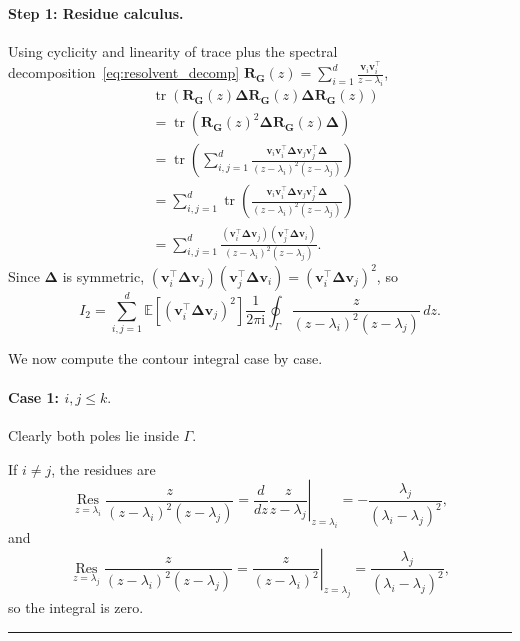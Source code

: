 \documentclass{article}
\newcommand{\Ex}[1]{\mbox{}\mathbb{E}\left[#1\right]}
\newcommand{\ts}{\top}
\newcommand{\vb}{\mathbf{v}}
\newcommand{\Gb}{\mathbf{G}}
\newcommand{\Rb}{\mathbf{R}}
\newcommand{\BlackBox}{\rule{1.5ex}{1.5ex}}  %
\newenvironment{proof}{\par\noindent{\bf Proof\ }}{\hfill\BlackBox\par\medskip}
\newcommand{\tr}{\mathop{\mathrm{tr}}}
\newcommand{\rbr}[1]{\left(#1\right)}
\newcommand{\Deltab}{\boldsymbol{\Delta}}
\begin{document}
\begin{proof}
\paragraph{Step 1: Residue calculus.}
Using cyclicity and linearity of trace plus the spectral decomposition~\eqref{eq:resolvent_decomp} $\Rb_\Gb(z) = \sum_{i=1}^d\frac{\vb_i\vb_i^\ts}{z-\lambda_i}$,
\begin{align*}
    &\tr\rbr{\Rb_\Gb(z) \Deltab \Rb_\Gb(z)\Deltab \Rb_\Gb(z)}\\
    &= \tr\rbr{\Rb_\Gb(z)^2 \Deltab \Rb_\Gb(z)\Deltab}\\
    &= \tr \rbr{\sum_{i,j=1}^{d}  \frac{\vb_i \vb_i^\ts \Deltab  \vb_j \vb_j^\ts \Deltab}{(z-\lambda_i)^2(z-\lambda_j)}}\\
    &=\sum_{i,j=1}^{d} \tr \rbr{  \frac{\vb_i \vb_i^\ts \Deltab  \vb_j \vb_j^\ts \Deltab}{(z-\lambda_i)^2(z-\lambda_j)}}\\
    &= \sum_{i,j=1}^{d}\frac{(\vb_i^\ts\Deltab\vb_j)(\vb_j^\ts\Deltab\vb_i)}{(z-\lambda_i)^2(z-\lambda_j)}.
\end{align*}
Since $\Deltab$ is symmetric, $(\vb_i^\ts\Deltab\vb_j)(\vb_j^\ts\Deltab\vb_i) = (\vb_i^\ts\Deltab\vb_j)^2$, so
\begin{equation}\label{eq:I2-master}
    I_2 = \sum_{i,j=1}^{d}\Ex{(\vb_i^\ts\Deltab\vb_j)^2}\frac{1}{2\pi \mathrm{i}}\oint_\Gamma\frac{z}{(z-\lambda_i)^2(z-\lambda_j)}\,dz.
\end{equation}

We now compute the contour integral case by case.

\paragraph{Case 1: $i,j\le k.$}
Clearly both poles lie inside $\Gamma$.

If $i\neq j$, the residues are
\begin{equation}
    \operatorname*{Res}_{z=\lambda_i}\frac{z}{(z-\lambda_i)^2(z-\lambda_j)}
    =
    \left.\frac{d}{dz}\frac{z}{z-\lambda_j}\right|_{z=\lambda_i}
    =
    -\frac{\lambda_j}{(\lambda_i-\lambda_j)^2},
\end{equation}
and
\begin{equation}
    \operatorname*{Res}_{z=\lambda_j}\frac{z}{(z-\lambda_i)^2(z-\lambda_j)}
    =
    \left.\frac{z}{(z-\lambda_i)^2}\right|_{z=\lambda_j}
    =
    \frac{\lambda_j}{(\lambda_i-\lambda_j)^2},
\end{equation}
so the integral is zero. 


\end{proof}
\end{document}
